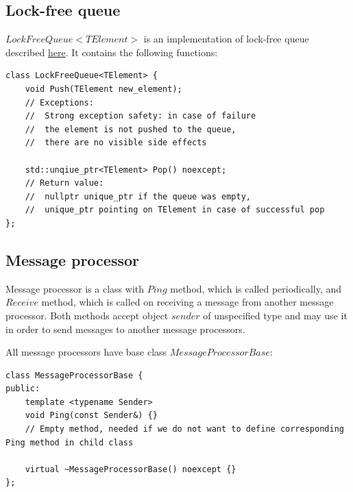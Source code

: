 \documentclass{article}
\begin{document}
\subsection{Lock-free queue}

$LockFreeQueue<TElement>$ is an implementation of lock-free queue described \hyperref[subsec:dealloc_lock_free_queue]{here}. It contains the following functions:

\begin{lstlisting}
class LockFreeQueue<TElement> {
	void Push(TElement new_element);
	// Exceptions:
	// 	Strong exception safety: in case of failure
	// 	the element is not pushed to the queue,
	// 	there are no visible side effects

	std::unqiue_ptr<TElement> Pop() noexcept;
	// Return value:
	// 	nullptr unique_ptr if the queue was empty,
	// 	unique_ptr pointing on TElement in case of successful pop
};
\end{lstlisting}

\subsection{Message processor}
\label{subsec:message_processor}
Message processor is a class with $Ping$ method, which is called periodically, and $Receive$ method, which is called on receiving a message from another message processor. Both methods accept object $sender$ of unspecified type and may use it in order to send messages to another message processors.

All message processors have base class $MessageProcessorBase$:

\begin{lstlisting}
class MessageProcessorBase {
public:
	template <typename Sender>
	void Ping(const Sender&) {}
	// Empty method, needed if we do not want to define corresponding Ping method in child class

	virtual ~MessageProcessorBase() noexcept {}
};
\end{lstlisting}
\end{document}
